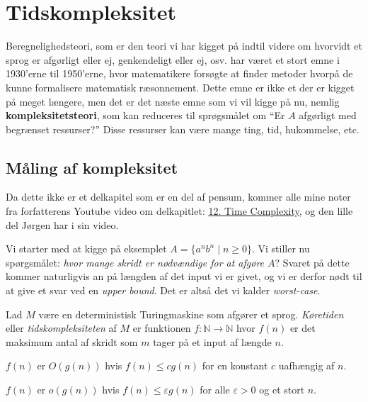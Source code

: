 \chapter{Tidskompleksitet}
Beregnelighedsteori, som er den teori vi har kigget på indtil videre om hvorvidt et sprog er afgørligt eller ej, genkendeligt eller ej, osv. har været et stort emne i 1930'erne til 1950'erne, hvor matematikere forsøgte at finder metoder hvorpå de kunne formalisere matematisk ræsonnement. Dette emne er ikke et der er kigget på meget længere, men det er det næste emne som vi vil kigge på nu, nemlig \textbf{kompleksitetsteori}, som kan reduceres til sprøgsmålet om ``Er $A$ afgørligt med begrænset ressurser?'' Disse ressurser kan være mange ting, tid, hukommelse, etc.

\section{Måling af kompleksitet}%
\label{sec:measuringcomplexity}

Da dette ikke er et delkapitel som er en del af pensum, kommer alle mine noter fra forfatterens Youtube video om delkapitlet: \href{https://www.youtube.com/watch?v=asjAc90L8rE&list=PLidiQIHRzpXIFFbyGrWkqXXVj0BztDcTF&index=12}{12. Time Complexity}, og den lille del Jørgen har i sin video.

Vi starter med at kigge på eksemplet $A = \{a^{n}b^{n} \mid n \ge 0\}$. Vi stiller nu spørgsmålet: \textit{hvor mange skridt er nødvændige for at afgøre $A$}? Svaret på dette kommer naturligvis an på længden af det input vi er givet, og vi er derfor nødt til at give et svar ved en \textit{upper bound}. Det er altså det vi kalder \textit{worst-case}.

\begin{definition}[Køretid]
	Lad $M$ være en deterministisk Turingmaskine som afgører et sprog. \textit{Køretiden} eller \textit{tidskompleksiteten} af $M$ er funktionen $f: \mathbb{N} \rightarrow \mathbb{N}$ hvor $f(n)$ er det maksimum antal af skridt som $m$ tager på et input af længde $n$.
\end{definition}

\begin{definition}[Store $O$]
	$f(n)$ er $O(g(n))$ hvis $f(n) \le cg(n)$ for en konstant $c$ uafhængig af $n$.
\end{definition}

\begin{definition}[Lille $o$]
	$f(n)$ er $o(g(n))$ hvis $f(n) \le \varepsilon g(n)$ for alle $\varepsilon > 0$ og et stort $n$.
\end{definition}

